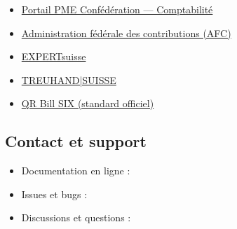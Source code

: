 \documentclass[a4paper,11pt,oneside]{article}
\begin{document}
\begin{itemize}
    \item \href{https://www.kmu.admin.ch/kmu/fr/home/savoir-pratique/finances/comptabilite-et-revision.html}{Portail PME Confédération — Comptabilité}
    \item \href{https://www.estv.admin.ch/}{Administration fédérale des contributions (AFC)}
    \item \href{https://www.expertsuisse.ch/}{EXPERTsuisse}
    \item \href{https://www.treuhand-suisse.ch/}{TREUHAND|SUISSE}
    \item \href{https://www.six-group.com/en/products-services/banking-services/standardization/qr-bill.html}{QR Bill SIX (standard officiel)}
\end{itemize}

\subsection{Contact et support}

\begin{itemize}
    \item Documentation en ligne : 
    \item Issues et bugs : 
    \item Discussions et questions : 
\end{itemize}

\clearpage

\keshversionnote
\end{document}
